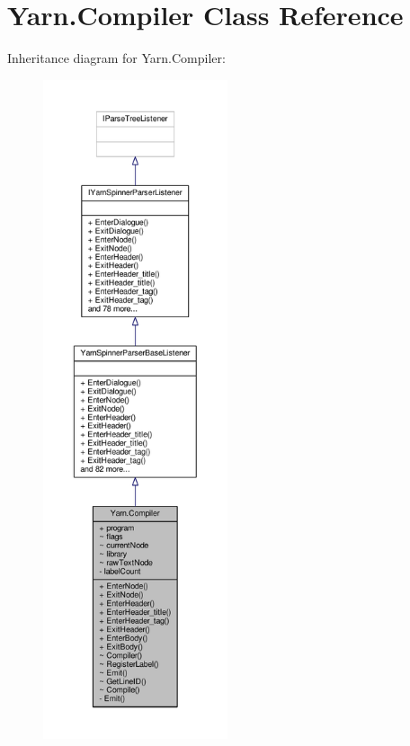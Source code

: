 \hypertarget{a00051}{\section{Yarn.\-Compiler Class Reference}
\label{a00051}
}


Inheritance diagram for Yarn.\-Compiler\-:
\nopagebreak
\begin{figure}[H]
\begin{center}
\leavevmode
\includegraphics[height=550pt]{a00562}
\end{center}
\end{figure}


